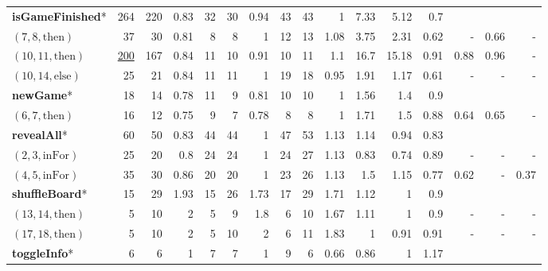 \documentclass[sigconf,review, anonymous]{acmart}
\newcommand{\thenBr}{\text{then}}
\newcommand{\elseBr}{\text{else}}
\newcommand{\inFor}{\text{inFor}}
\newcommand{\un}[1]{\underline{#1}}
\begin{document}
\begin{table}[!t]
\begin{tabular}{l|rrr|rrr|rrr|rrr|rrr}
    \textbf{isGameFinished}* & 264      & 220  & 0.83      & 32 & 30 & 0.94             & 43 & 43 & 1                  & 7.33 & 5.12  & 0.7    &      &      &        \\
    $(7,8,\thenBr)$          & 37       & 30   & 0.81      & 8  & 8  & 1                & 12 & 13 & 1.08               & 3.75 & 2.31  & 0.62   & -  & 0.66 & -   \\
    $(10,11,\thenBr)$        & \un{200} & 167  & 0.84      & 11 & 10 & 0.91             & 10 & 11 & 1.1                & 16.7 & 15.18 & 0.91   & 0.88 & 0.96 & -   \\
    $(10,14,\elseBr)$        & 25       & 21   & 0.84      & 11 & 11 & 1                & 19 & 18 & 0.95               & 1.91 & 1.17  & 0.61   & - & - & -   \\
    \hline
    \textbf{newGame}*   
                             & 18       & 14   & 0.78      & 11 & 9  & 0.81             & 10 & 10 & 1                  & 1.56 & 1.4   & 0.9    &      &      &      \\
    $(6,7,\thenBr)$          & 16       & 12   & 0.75      & 9  & 7  & 0.78             & 8  & 8  & 1                  & 1.71 & 1.5   & 0.88   & 0.64 & 0.65 & -  \\
    \hline
    \textbf{revealAll}*  
                             & 60       & 50   & 0.83      & 44 & 44 & 1                & 47 & 53 & 1.13               & 1.14 & 0.94  & 0.83   &      &      &        \\
    $(2,3,\inFor)$           & 25       & 20   & 0.8       & 24 & 24 & 1                & 24 & 27 & 1.13               & 0.83 & 0.74  & 0.89   & - & - & -  \\
    $(4,5,\inFor)$           & 35       & 30   & 0.86      & 20 & 20 & 1                & 23 & 26 & 1.13               & 1.5  & 1.15  & 0.77   & 0.62 & -   &  0.37  \\
    \hline
    \textbf{shuffleBoard}*   
                             & 15       & 29   & 1.93      & 15 & 26 & 1.73             & 17 & 29 & 1.71               & 1.12 & 1     & 0.9    &      &      &       \\
    $(13,14,\thenBr)$        & 5        & 10   & 2         & 5  & 9  & 1.8              & 6  & 10 & 1.67               & 1.11 & 1     & 0.9    & - & - & -  \\
    $(17,18,\thenBr)$        & 5        & 10   & 2         & 5  & 10 & 2                & 6  & 11 & 1.83               & 1    & 0.91  & 0.91   & - & - & -   \\
    \hline
   \textbf{toggleInfo}*      & 6        & 6    & 1         & 7  & 7 & 1                 & 9 & 6   & 0.66               & 0.86  & 1     & 1.17  &    &      &       \\

\end{tabular}
\end{table}
\end{document}
